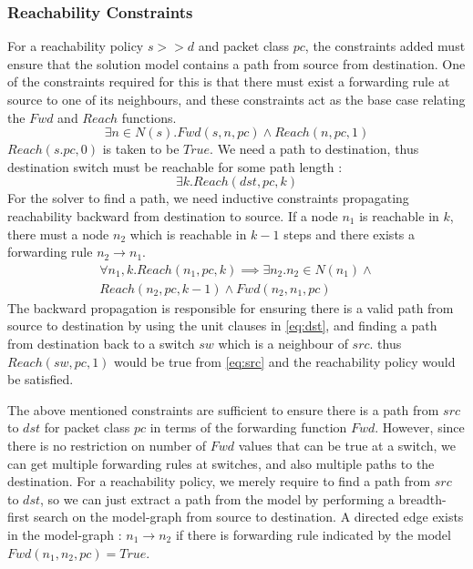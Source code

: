 \documentclass[]{sig}
\begin{document}
\subsubsection{Reachability Constraints} \label{sec:reach}
For a reachability policy $s >> d$ and packet class $pc$, the constraints added must ensure that the solution model contains a path from source from destination. One of the constraints required for this is that there must exist a forwarding rule at source to one of its neighbours, and these constraints act as the base case relating the $Fwd$ and $Reach$ functions. 
\begin{equation} \label{eq:src}
	\exists n \in N(s). Fwd(s, n, pc) \wedge Reach(n, pc, 1)
\end{equation}
$Reach(s.pc,0)$ is taken to be $True$. We need a path to destination, thus destination switch must be reachable for some path length : 
\begin{equation} \label{eq:dst}
	\exists k. Reach(dst, pc, k)
\end{equation}
For the solver to find a path, we need inductive constraints propagating reachability backward from destination to source. If a node $n_1$ is reachable in $k$, there must a node $n_2$ which is reachable in  $k-1$ steps and there exists a forwarding rule $n_2 \rightarrow n_1$.
\begin{multline}
\forall n_1,k.  Reach(n_1,pc,k) \implies \exists n_2.  n_2 \in N(n_1) \wedge \\ Reach(n_2,pc,k-1) \wedge Fwd(n_2,n_1,pc)
\end{multline} 
The backward propagation is responsible for ensuring there is a valid path from source to destination by using the unit clauses in \cref{eq:dst}, and finding a path from destination back to a switch $sw$ which is a neighbour of $src$. thus $Reach(sw,pc,1)$ would be true from \cref{eq:src} and the reachability policy would be satisfied. 

The above mentioned constraints are sufficient to ensure there is a path from $src$ to $dst$ for packet class $pc$ in terms of the forwarding function $Fwd$. However, since there is no restriction on number of $Fwd$ values that can be true at a switch, we can get multiple forwarding rules at switches, and also multiple paths to the destination. For a reachability policy, we merely require to find a path from $src$ to $dst$, so we can just extract a path from the model by performing a breadth-first search on the model-graph from source to destination. A directed edge exists in the model-graph : $n_1 \rightarrow n_2$ if there is forwarding rule indicated by the model $Fwd(n_1,n_2, pc) = True$.
\end{document}
